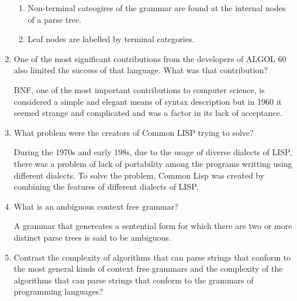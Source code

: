 \begin{enumerate}
  \begin{answer}

  \begin{enumerate}
    \item Non-terminal cateogires of the grammar are found at the internal nodes of a parse tree.
    \item Leaf nodes are labelled by terminal categories.
    \end{enumerate}

    \end{answer}


  \item One of the most significant contributions from the developers
    of ALGOL 60 also limited the success of that language. What was
    that contribution?

  \begin{answer}

    BNF, one of the most important contributions to computer science, is considered a simple and elegant means of syntax description but in 1960 it seemed strange and complicated and was a factor in its lack of acceptance.

    \end{answer}

  \item What problem were the creators of Common LISP trying to solve?

  \begin{answer}

    During the 1970s and early 198s, due to the usage of diverse dialects of LISP, there was a problem of lack of portability among the programs writting using different dialects. To solve the problem, Common Lisp was created by combining the features of different dialects of LISP.

    \end{answer}

  \item What is an ambiguous context free grammar?

  \begin{answer}

    A grammar that genereates a sentential form for which there are two or more distinct parse trees is said to be ambiguous.

    \end{answer}

  \item Contrast the complexity of algorithms that can parse strings
    that conform to the most general kinds of context free grammars
    and the complexity of the algorithms that can parse strings that
    conform to the grammars of programming languages?


\end{enumerate}
